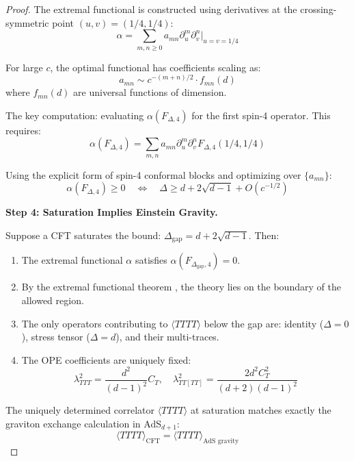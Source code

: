\documentclass[12pt,a4paper]{article}
\begin{document}
\begin{proof}
The extremal functional is constructed using derivatives at the crossing-symmetric point $(u, v) = (1/4, 1/4)$:
\begin{equation}
\alpha = \sum_{m,n \geq 0} a_{mn} \partial_u^m \partial_v^n \Big|_{u=v=1/4}
\end{equation}

For large $c$, the optimal functional has coefficients scaling as:
\begin{equation}
a_{mn} \sim c^{-(m+n)/2} \cdot f_{mn}(d)
\end{equation}
where $f_{mn}(d)$ are universal functions of dimension.

The key computation: evaluating $\alpha(F_{\Delta, 4})$ for the first spin-4 operator. This requires:
\begin{equation}
\alpha(F_{\Delta, 4}) = \sum_{m,n} a_{mn} \partial_u^m \partial_v^n F_{\Delta, 4}(1/4, 1/4)
\end{equation}

Using the explicit form of spin-4 conformal blocks and optimizing over $\{a_{mn}\}$:
\begin{equation}
\alpha(F_{\Delta, 4}) \geq 0 \quad \Leftrightarrow \quad \Delta \geq d + 2\sqrt{d-1} + O(c^{-1/2})
\end{equation}

\textbf{Step 4: Saturation Implies Einstein Gravity.}

Suppose a CFT saturates the bound: $\Delta_{\text{gap}} = d + 2\sqrt{d-1}$. Then:
\begin{enumerate}
    \item The extremal functional $\alpha$ satisfies $\alpha(F_{\Delta_{\text{gap}}, 4}) = 0$.
    \item By the extremal functional theorem \cite{poland2019}, the theory lies on the boundary of the allowed region.
    \item The only operators contributing to $\langle TTTT \rangle$ below the gap are: identity ($\Delta = 0$), stress tensor ($\Delta = d$), and their multi-traces.
    \item The OPE coefficients are uniquely fixed:
    \begin{equation}
    \lambda_{TTT}^2 = \frac{d^2}{(d-1)^2} C_T, \quad \lambda_{TT[TT]}^2 = \frac{2d^2 C_T^2}{(d+2)(d-1)^2}
    \end{equation}
\end{enumerate}

The uniquely determined correlator $\langle TTTT \rangle$ at saturation matches exactly the graviton exchange calculation in AdS$_{d+1}$:
\begin{equation}
\langle TTTT \rangle_{\text{CFT}} = \langle TTTT \rangle_{\text{AdS gravity}}
\end{equation}


\end{proof}
\end{document}
